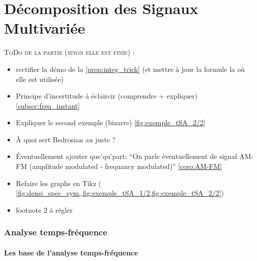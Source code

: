 \part{Décomposition des Signaux Multivariée}

\textsc{ToDo de  la partie (sinon elle est finie) :}
\begin{itemize}	
	
	\item rectifier la démo de la \cref{prop:integ_trick} (et mettre à jour la formule la où elle est utilisée)
	
	\item Principe d'incertitude à éclaircir (comprendre + expliquer) \cref{subsec:freq_instant}
	
	\item Expliquer le second exemple (bizarre) \cref{fig:exemple_tSA_2/2}
	
	\item \`A quoi sert Bedrosian au juste ? 
	
	\item \'Eventuellement ajouter que'qu'part: ``On parle éventuellement de signal AM-FM (amplitude modulated - frequancy modulated)'' \cref{coro:AM-FM}
	
	\item Refaire les graphs en Tikz ( \cref{fig:densi_spec_sym,,fig:exemple_tSA_1/2,fig:exemple_tSA_2/2})
	
	\item footnote 2 à régler
	
\end{itemize}


\section{Analyse temps-fréquence}


\subsection{Les base de l'analyse temps-fréquence}\label{sec:temp-freq}


